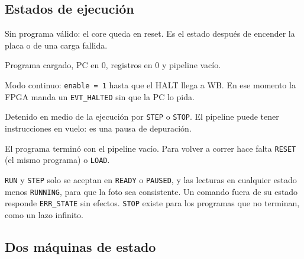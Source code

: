 
\subsection{Estados de ejecución}


\begin{description}[nosep,leftmargin=1.2em]
  \item[\texttt{NO\_PROG}] Sin programa válido: el core queda en reset. Es el estado después de
        encender la placa o de una carga fallida.
  \item[\texttt{READY}] Programa cargado, PC en 0, registros en 0 y pipeline vacío.
  \item[\texttt{RUNNING}] Modo continuo: \texttt{enable = 1} hasta que el HALT llega a WB. En
        ese momento la FPGA manda un \texttt{EVT\_HALTED} sin que la PC lo pida.
  \item[\texttt{PAUSED}] Detenido en medio de la ejecución por \texttt{STEP} o \texttt{STOP}. El
        pipeline puede tener instrucciones en vuelo: es una pausa de depuración.
  \item[\texttt{HALTED}] El programa terminó con el pipeline vacío. Para volver a correr hace
        falta \texttt{RESET} (el mismo programa) o \texttt{LOAD}.
\end{description}

\texttt{RUN} y \texttt{STEP} solo se aceptan en \texttt{READY} o \texttt{PAUSED}, y las lecturas en
cualquier estado menos \texttt{RUNNING}, para que la foto sea consistente. Un comando fuera de su
estado responde \texttt{ERR\_STATE} sin efectos. \texttt{STOP} existe para los programas que no
terminan, como un lazo infinito.

\subsection{Dos máquinas de estado}

